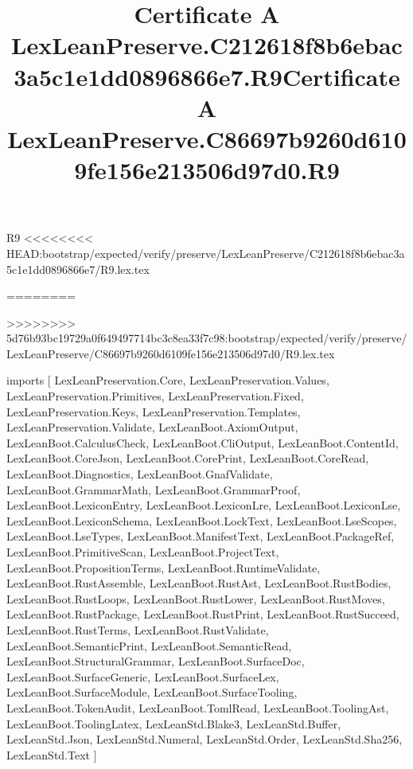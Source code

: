 \begin{lexlean}{R9}
<<<<<<<< HEAD:bootstrap/expected/verify/preserve/LexLeanPreserve/C212618f8b6ebac3a5c1e1dd0896866e7/R9.lex.tex
\title{Certificate A LexLeanPreserve.C212618f8b6ebac3a5c1e1dd0896866e7.R9}
========
\title{Certificate A LexLeanPreserve.C86697b9260d6109fe156e213506d97d0.R9}
>>>>>>>> 5d76b93bc19729a0f649497714bc3c8ea33f7c98:bootstrap/expected/verify/preserve/LexLeanPreserve/C86697b9260d6109fe156e213506d97d0/R9.lex.tex
\begin{coremodule}
imports [
  LexLeanPreservation.Core,
  LexLeanPreservation.Values,
  LexLeanPreservation.Primitives,
  LexLeanPreservation.Fixed,
  LexLeanPreservation.Keys,
  LexLeanPreservation.Templates,
  LexLeanPreservation.Validate,
  LexLeanBoot.AxiomOutput,
  LexLeanBoot.CalculusCheck,
  LexLeanBoot.CliOutput,
  LexLeanBoot.ContentId,
  LexLeanBoot.CoreJson,
  LexLeanBoot.CorePrint,
  LexLeanBoot.CoreRead,
  LexLeanBoot.Diagnostics,
  LexLeanBoot.GnafValidate,
  LexLeanBoot.GrammarMath,
  LexLeanBoot.GrammarProof,
  LexLeanBoot.LexiconEntry,
  LexLeanBoot.LexiconLre,
  LexLeanBoot.LexiconLse,
  LexLeanBoot.LexiconSchema,
  LexLeanBoot.LockText,
  LexLeanBoot.LseScopes,
  LexLeanBoot.LseTypes,
  LexLeanBoot.ManifestText,
  LexLeanBoot.PackageRef,
  LexLeanBoot.PrimitiveScan,
  LexLeanBoot.ProjectText,
  LexLeanBoot.PropositionTerms,
  LexLeanBoot.RuntimeValidate,
  LexLeanBoot.RustAssemble,
  LexLeanBoot.RustAst,
  LexLeanBoot.RustBodies,
  LexLeanBoot.RustLoops,
  LexLeanBoot.RustLower,
  LexLeanBoot.RustMoves,
  LexLeanBoot.RustPackage,
  LexLeanBoot.RustPrint,
  LexLeanBoot.RustSucceed,
  LexLeanBoot.RustTerms,
  LexLeanBoot.RustValidate,
  LexLeanBoot.SemanticPrint,
  LexLeanBoot.SemanticRead,
  LexLeanBoot.StructuralGrammar,
  LexLeanBoot.SurfaceDoc,
  LexLeanBoot.SurfaceGeneric,
  LexLeanBoot.SurfaceLex,
  LexLeanBoot.SurfaceModule,
  LexLeanBoot.SurfaceTooling,
  LexLeanBoot.TokenAudit,
  LexLeanBoot.TomlRead,
  LexLeanBoot.ToolingAst,
  LexLeanBoot.ToolingLatex,
  LexLeanStd.Blake3,
  LexLeanStd.Buffer,
  LexLeanStd.Json,
  LexLeanStd.Numeral,
  LexLeanStd.Order,
  LexLeanStd.Sha256,
  LexLeanStd.Text
]


\end{coremodule}
\end{lexlean}
